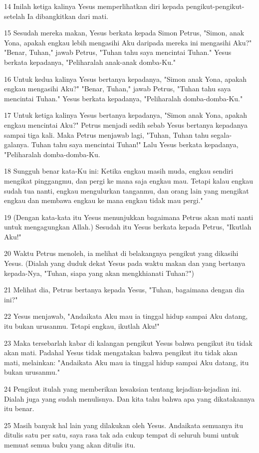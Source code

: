 \par 14 Inilah ketiga kalinya Yesus memperlihatkan diri kepada pengikut-pengikut-setelah Ia dibangkitkan dari mati.
\par 15 Sesudah mereka makan, Yesus berkata kepada Simon Petrus, "Simon, anak Yona, apakah engkau lebih mengasihi Aku daripada mereka ini mengasihi Aku?" "Benar, Tuhan," jawab Petrus, "Tuhan tahu saya mencintai Tuhan." Yesus berkata kepadanya, "Peliharalah anak-anak domba-Ku."
\par 16 Untuk kedua kalinya Yesus bertanya kepadanya, "Simon anak Yona, apakah engkau mengasihi Aku?" "Benar, Tuhan," jawab Petrus, "Tuhan tahu saya mencintai Tuhan." Yesus berkata kepadanya, "Peliharalah domba-domba-Ku."
\par 17 Untuk ketiga kalinya Yesus bertanya kepadanya, "Simon anak Yona, apakah engkau mencintai Aku?" Petrus menjadi sedih sebab Yesus bertanya kepadanya sampai tiga kali. Maka Petrus menjawab lagi, "Tuhan, Tuhan tahu segala-galanya. Tuhan tahu saya mencintai Tuhan!" Lalu Yesus berkata kepadanya, "Peliharalah domba-domba-Ku.
\par 18 Sungguh benar kata-Ku ini: Ketika engkau masih muda, engkau sendiri mengikat pinggangmu, dan pergi ke mana saja engkau mau. Tetapi kalau engkau sudah tua nanti, engkau mengulurkan tanganmu, dan orang lain yang mengikat engkau dan membawa engkau ke mana engkau tidak mau pergi."
\par 19 (Dengan kata-kata itu Yesus menunjukkan bagaimana Petrus akan mati nanti untuk mengagungkan Allah.) Sesudah itu Yesus berkata kepada Petrus, "Ikutlah Aku!"
\par 20 Waktu Petrus menoleh, ia melihat di belakangnya pengikut yang dikasihi Yesus. (Dialah yang duduk dekat Yesus pada waktu makan dan yang bertanya kepada-Nya, "Tuhan, siapa yang akan mengkhianati Tuhan?")
\par 21 Melihat dia, Petrus bertanya kepada Yesus, "Tuhan, bagaimana dengan dia ini?"
\par 22 Yesus menjawab, "Andaikata Aku mau ia tinggal hidup sampai Aku datang, itu bukan urusanmu. Tetapi engkau, ikutlah Aku!"
\par 23 Maka tersebarlah kabar di kalangan pengikut Yesus bahwa pengikut itu tidak akan mati. Padahal Yesus tidak mengatakan bahwa pengikut itu tidak akan mati, melainkan: "Andaikata Aku mau ia tinggal hidup sampai Aku datang, itu bukan urusanmu."
\par 24 Pengikut itulah yang memberikan kesaksian tentang kejadian-kejadian ini. Dialah juga yang sudah menulisnya. Dan kita tahu bahwa apa yang dikatakannya itu benar.
\par 25 Masih banyak hal lain yang dilakukan oleh Yesus. Andaikata semuanya itu ditulis satu per satu, saya rasa tak ada cukup tempat di seluruh bumi untuk memuat semua buku yang akan ditulis itu.


